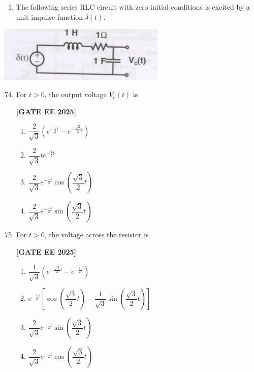 \documentclass[12pt]{article}
\begin{document}
\begin{enumerate}
\item The following series RLC circuit with zero initial conditions is excited by a unit impulse function $\delta(t)$.
\end{enumerate}
 
\begin{center}
\includegraphics[width=0.6\textwidth]{figs/q7475.png}
\end{center}

\begin{enumerate}[leftmargin=*, label=\textbf{Q.\arabic*:}]
\setcounter{enumi}{73}

\item For $t>0$, the output voltage $V_c(t)$ is
 
\noindent \textbf{[GATE EE 2025]}
\begin{enumerate}[label=(\Alph*)]
  \item $\dfrac{2}{\sqrt{3}}\left(e^{-\frac{1}{2}t} - e^{-\frac{\sqrt{3}}{2}t}\right)$
  \item $\dfrac{2}{\sqrt{3}} t e^{-\frac{1}{2} t}$
  \item $\dfrac{2}{\sqrt{3}} e^{-\frac{1}{2} t} \cos\left( \dfrac{\sqrt{3}}{2} t \right)$
  \item $\dfrac{2}{\sqrt{3}} e^{-\frac{1}{2} t} \sin\left( \dfrac{\sqrt{3}}{2} t \right)$
\end{enumerate}

\item For $t>0$, the voltage across the resistor is
 
\noindent \textbf{[GATE EE 2025]}
\begin{enumerate}[label=(\Alph*)]
  \item $\dfrac{1}{\sqrt{3}} \left( e^{-\frac{\sqrt{3}}{2} t} - e^{-\frac{1}{2} t} \right)$
  \item $e^{-\frac{1}{2} t} \left[ \cos \left( \dfrac{\sqrt{3}}{2} t \right) - \dfrac{1}{\sqrt{3}} \sin \left( \dfrac{\sqrt{3}}{2} t \right) \right]$
  \item $\dfrac{2}{\sqrt{3}} e^{-\frac{1}{2} t} \sin \left( \dfrac{\sqrt{3}}{2} t \right)$
  \item $\dfrac{2}{\sqrt{3}} e^{-\frac{1}{2} t} \cos \left( \dfrac{\sqrt{3}}{2} t \right)$
\end{enumerate}

\end{enumerate}
\end{document}
